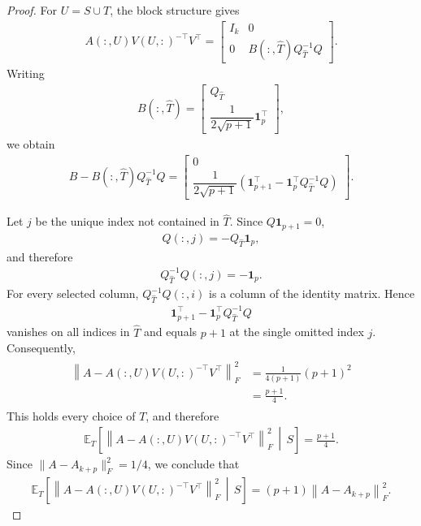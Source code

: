 \documentclass[10pt,a4paper]{amsart}
\newcommand{\be}{\begin{eqnarray}}
\newcommand{\ee}{\end{eqnarray}}
\begin{document}
\begin{proof}
For $U=S\cup T$, the block structure gives
\be
A(:,U)V(U,:)^{-\top}V^\top
=
\begin{bmatrix}
I_k & 0\\
0 &
B(:,\widehat T)Q_{\widehat T}^{-1}Q
\end{bmatrix}.
\ee
Writing
\be
B(:,\widehat T)
=
\begin{bmatrix}
Q_{\widehat T}\\[1mm]
\dfrac{1}{2\sqrt{p+1}}\mathbf{1}_p^\top
\end{bmatrix},
\ee
we obtain
\be
B-
B(:,\widehat T)Q_{\widehat T}^{-1}Q
=
\begin{bmatrix}
0\\[1mm]
\dfrac{1}{2\sqrt{p+1}}
\left(
\mathbf{1}_{p+1}^\top
-
\mathbf{1}_p^\top Q_{\widehat T}^{-1}Q
\right)
\end{bmatrix}.
\ee

Let $j$ be the unique index not contained in $\widehat T$.
Since $Q\mathbf{1}_{p+1}=0$,
\be
Q(:,j)
=
-Q_{\widehat T}\mathbf{1}_p,
\ee
and therefore
\be
Q_{\widehat T}^{-1}Q(:,j)
=
-\mathbf{1}_p.
\ee
For every selected column, $Q_{\widehat T}^{-1}Q(:,i)$ is a
column of the identity matrix. Hence
\be
\mathbf{1}_{p+1}^\top
-
\mathbf{1}_p^\top Q_{\widehat T}^{-1}Q
\ee
vanishes on all indices in $\widehat T$ and equals $p+1$ at the
single omitted index $j$. Consequently,
\be
\begin{aligned}
\left\|
A-A(:,U)V(U,:)^{-\top}V^\top
\right\|_F^2
&=
\frac{1}{4(p+1)}(p+1)^2\\
&=
\frac{p+1}{4}.
\end{aligned}
\ee
This holds every choice of $T$, and therefore
\be
\mathbb{E}_T
\left[
\left\|
A-A(:,U)V(U,:)^{-\top}V^\top
\right\|_F^2
\,\middle|\,S
\right]
=
\frac{p+1}{4}.
\ee
Since $\|A-A_{k+p}\|_F^2=1/4$, we conclude that
\be
\mathbb{E}_T
\left[
\left\|
A-A(:,U)V(U,:)^{-\top}V^\top
\right\|_F^2
\,\middle|\,S
\right]
=
(p+1)\left\|A-A_{k+p}\right\|_F^2.
\ee
\end{proof}
\end{document}
